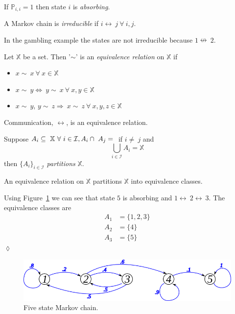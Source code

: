 \begin{definition}
\label{def:absorbing}
If $\mathbb{P}_{i,i}=1$ then state $i$ is \textit{absorbing}.
\end{definition}

\begin{definition}
A Markov chain is \textit{irreducible} if $i\leftrightarrow~j~\forall~i,j$.
\end{definition}
In the gambling example the states are not irreducible because $1\nleftrightarrow~2$.

\begin{definition}
Let $\mathbb{X}$ be a set.
Then '$\sim$' is an \textit{equivalence relation} on $\mathbb{X}$ if
\begin{itemize}
\item $x\sim~x~\forall~x\in\mathbb{X}$
\item $x\sim~y \Leftrightarrow~y\sim~x~\forall~x,y\in\mathbb{X}$
\item $x\sim~y$, $y\sim~z \Rightarrow~x\sim~z~\forall~x,y,z\in\mathbb{X}$
\end{itemize}
\end{definition}

\begin{theorem}
Communication, $\leftrightarrow$, is an equivalence relation.
\end{theorem}

\begin{definition}
Suppose $A_i\subseteq~\mathbb{X}~\forall~i\in\mathcal{I}, A_i\cap~A_j=\null$ if $i\neq~j$ and
$$\bigcup_{i\in\mathcal{I}}A_i = \mathbb{X}$$
then $\{A_i\}_{i\in\mathcal{I}}$ \textit{partitions} $\mathbb{X}$.
\end{definition}

\begin{theorem}
An equivalence relation on $\mathbb{X}$ partitions $\mathbb{X}$ into equivalence classes.
\end{theorem}

\begin{example}
Using Figure~\ref{fig:09mc5} we can see that state $5$ is absorbing and $1\leftrightarrow~2\leftrightarrow~3$.
The equivalence classes are
\begin{align*}
A_1 &= \{1,2,3\} \\
A_2 &= \{4\} \\
A_3 &= \{5\}
\end{align*}
$\lozenge$
\end{example}

\begin{figure}[ht!]
\centering
\includegraphics[width=.4\textwidth]{images/09mc5}
\caption{Five state Markov chain.}
\label{fig:09mc5}
\end{figure}

